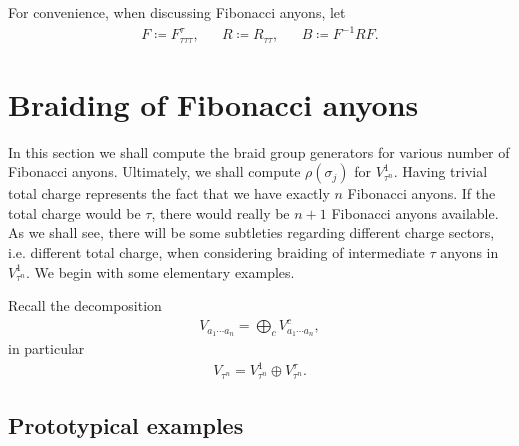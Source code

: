 \documentclass[a4paper,10pt,oneside]{book}
\theoremstyle{plain}
\theoremstyle{definition}
\theoremstyle{remark}
\begin{document}
For convenience, when discussing Fibonacci anyons, let
\begin{align*}
  F \coloneqq F_{τττ}^τ, &&
  R \coloneqq R_{ττ}, &&
  B \coloneqq F^{-1} R F.
\end{align*}



\section{Braiding of Fibonacci anyons}

In this section we shall compute the braid group generators for various number of Fibonacci anyons. Ultimately, we shall compute $ρ(σ_j)$ for $V_{τ^n}^1$. Having trivial total charge represents the fact that we have exactly $n$ Fibonacci anyons. If the total charge would be $τ$, there would really be $n+1$ Fibonacci anyons available. As we shall see, there will be some subtleties regarding different charge sectors, i.e. different total charge, when considering braiding of intermediate $τ$ anyons in $V_{τ^n}^1$. We begin with some elementary examples.

Recall the decomposition
\begin{align*}
  V_{a_1\cdots a_n} = \bigoplus_{c} V_{a_1 \cdots a_n}^c,
\end{align*}
in particular
\begin{align*}
  V_{τ^n} = V_{τ^n}^1 \oplus V_{τ^n}^τ.
\end{align*}


\subsection{Prototypical examples}
\end{document}
